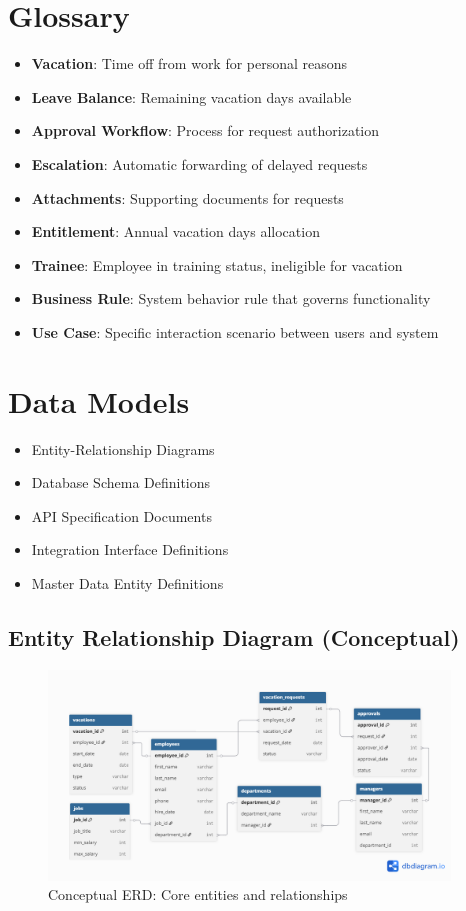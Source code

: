 \documentclass[12pt,a4paper]{article}
\begin{document}
\section{Glossary}
\begin{itemize}
    \item \textbf{Vacation}: Time off from work for personal reasons
    \item \textbf{Leave Balance}: Remaining vacation days available
    \item \textbf{Approval Workflow}: Process for request authorization
    \item \textbf{Escalation}: Automatic forwarding of delayed requests
    \item \textbf{Attachments}: Supporting documents for requests
    \item \textbf{Entitlement}: Annual vacation days allocation
    \item \textbf{Trainee}: Employee in training status, ineligible for vacation
    \item \textbf{Business Rule}: System behavior rule that governs functionality
    \item \textbf{Use Case}: Specific interaction scenario between users and system
\end{itemize}

\section{Data Models}
\begin{itemize}
    \item Entity-Relationship Diagrams
    \item Database Schema Definitions
    \item API Specification Documents
    \item Integration Interface Definitions
    \item Master Data Entity Definitions
\end{itemize}

\subsection{Entity Relationship Diagram (Conceptual)}
\begin{figure}[H]
\centering
\includegraphics[width=0.95\textwidth]{Diagrams/Entity-Relationship/Entity-Relationship.png}
\caption{Conceptual ERD: Core entities and relationships}
\label{fig:conceptual-erd}
\end{figure}
\end{document}
